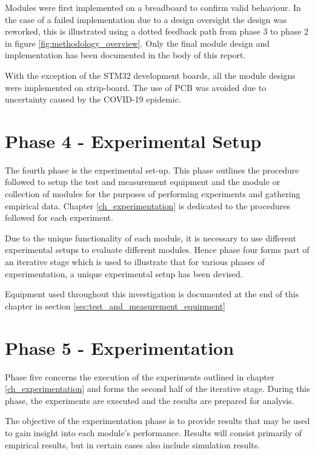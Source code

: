 Modules were first implemented on a breadboard to confirm valid behaviour. In the case of a failed implementation due to a design oversight the design was reworked, this is illustrated using a dotted feedback path from phase 3 to phase 2 in figure \ref{fig:methodology_overview}. Only the final module design and implementation has been documented in the body of this report.

With the exception of the STM32 development boards, all the module designs were implemented on strip-board. The use of PCB was avoided due to uncertainty caused by the COVID-19 epidemic.



\section{Phase 4 - Experimental Setup}

The fourth phase is the experimental set-up. This phase outlines the procedure followed to setup the test and measurement equipment and the module or collection of modules for the purposes of performing experiments and gathering empirical data. Chapter \ref{ch_experimentation} is dedicated to the procedures followed for each experiment.

Due to the unique functionality of each module, it is necessary to use different experimental setups to evaluate different modules. Hence phase four forms part of an iterative stage which is used to illustrate that for various phases of experimentation, a unique experimental setup has been devised.

Equipment used throughout this investigation is documented at the end of this chapter in section \ref{sec:test_and_measurement_equipment}





\section{Phase 5 - Experimentation}

Phase five concerns the execution of the experiments outlined in chapter \ref{ch_experimentation} and forms the second half of the iterative stage. During this phase, the experiments are executed and the results are prepared for analysis.

The objective of the experimentation phase is to provide results that may be used to gain insight into each module's performance. Results will consist primarily of empirical results, but in certain cases also include simulation results.

